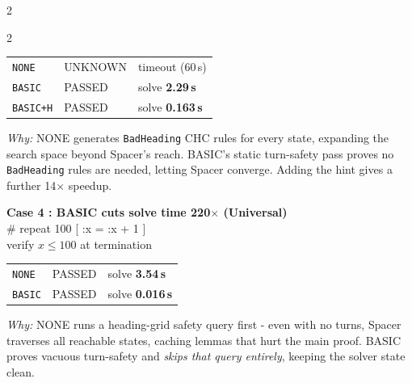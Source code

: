 \begin{multicols}{2}
\begin{multicols}{2}
\begin{tabular}{@{}lll@{}}
\texttt{NONE}    & \textcolor{orange!80!black}{UNKNOWN} & timeout (60\,s) \\
\texttt{BASIC}   & \textcolor{green!60!black}{PASSED}  & solve \textbf{2.29\,s} \\
\texttt{BASIC+H} & \textcolor{green!60!black}{PASSED}  & solve \textbf{0.163\,s} \\
\end{tabular}


{\scriptsize\textit{Why:} NONE generates \texttt{BadHeading} CHC rules for every state, expanding the search space beyond Spacer's reach.  BASIC's static turn-safety pass proves no \texttt{BadHeading} rules are needed, letting Spacer converge.  Adding the hint gives a further 14$\times$ speedup.\par}

\bigskip
\noindent\textbf{Case 4 : BASIC cuts solve time 220$\times$ (Universal)}\\[2pt]
{\ttfamily\textcolor{gray!60!black}{\# repeat 100 [ :x = :x + 1 ]\\
  verify $x \le 100$ at termination}}


\begin{tabular}{@{}lll@{}}
\texttt{NONE}  & \textcolor{green!60!black}{PASSED} & solve \textbf{3.54\,s} \\
\texttt{BASIC} & \textcolor{green!60!black}{PASSED} & solve \textbf{0.016\,s} \\
\end{tabular}


{\scriptsize\textit{Why:} NONE runs a heading-grid safety query first - even with no turns, Spacer traverses all reachable states, caching lemmas that hurt the main proof.  BASIC proves vacuous turn-safety and \emph{skips that query entirely}, keeping the solver state clean.\par}

\end{multicols}

\end{multicols}
